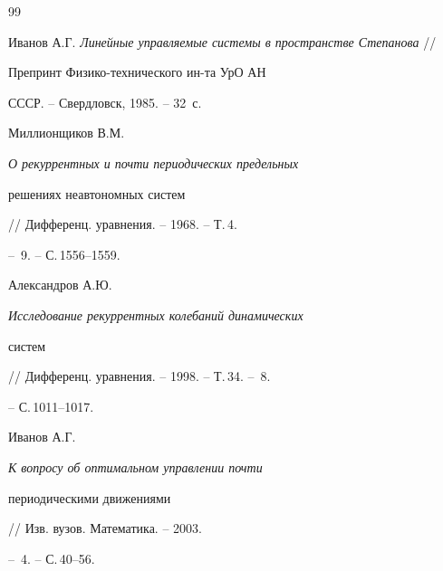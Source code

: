 \begin{thebibliography}{99}


Иванов А.Г. {\em Линейные управляемые системы в пространстве Степанова} //


Препринт Физико-технического ин-та УрО АН


СССР. -- Свердловск, 1985. -- 32~с. 




Миллионщиков В.М. {\em О рекуррентных и почти периодических предельных


решениях неавтономных систем} // Дифференц. уравнения. -- 1968. -- Т.\,4.


-- \No\,9. -- С.\,1556--1559.




Александров А.Ю. {\em Исследование рекуррентных колебаний динамических


систем} // Дифференц. уравнения. -- 1998. -- Т.\,34. -- \No\,8.


-- С.\,1011--1017.




Иванов А.Г. {\em К вопросу об оптимальном управлении почти


периодическими движениями} // Изв. вузов. Математика. -- 2003.


-- \No\,4. -- С.\,40--56.





\end{thebibliography}


